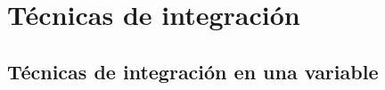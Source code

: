 \documentclass[11pt,spanish]{article} %
\begin{document}
\newpage
\section{T\'ecnicas de integraci\'on}
\subsection{T\'ecnicas de integraci\'on en una variable}
	
\end{document}
